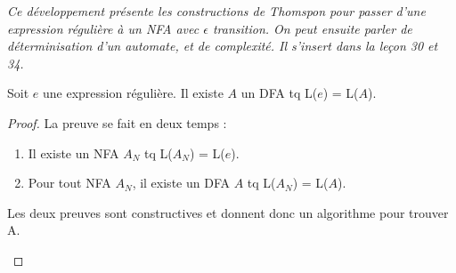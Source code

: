 
\textit{Ce développement présente les constructions de Thomspon pour passer d'une expression régulière à un NFA avec $\epsilon$ transition. On peut ensuite parler de déterminisation d'un automate, et de complexité. Il s'insert dans la leçon 30 et 34.}

\begin{theorem}
	Soit $e$ une expression régulière. Il existe $A$ un DFA tq L($e$) = L($A$).
\end{theorem}

\begin{proof}
	La preuve se fait en deux temps : 
	\begin{enumerate}
		\item Il existe un NFA $A_{N}$ tq L($A_{N}$) = L($e$).
		\item Pour tout NFA $A_{N}$, il existe un DFA $A$ tq L($A_{N}$) = L($A$).
	\end{enumerate}

	\begin{com}
		Les deux preuves sont constructives et donnent donc un algorithme pour trouver A.
	\end{com}


\end{proof}
